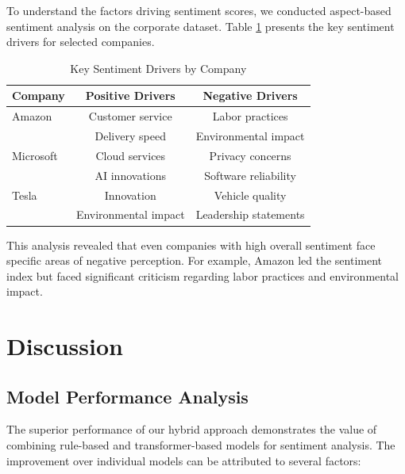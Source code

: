 \documentclass[conference]{IEEEtran}
\begin{document}
To understand the factors driving sentiment scores, we conducted aspect-based sentiment analysis on the corporate dataset. Table \ref{tab:sentiment_drivers} presents the key sentiment drivers for selected companies.

\begin{table}[!t]
\caption{Key Sentiment Drivers by Company}
\label{tab:sentiment_drivers}
\centering
\begin{tabular}{lcc}
\toprule
\textbf{Company} & \textbf{Positive Drivers} & \textbf{Negative Drivers} \\
\midrule
Amazon & Customer service & Labor practices \\
       & Delivery speed   & Environmental impact \\
\midrule
Microsoft & Cloud services & Privacy concerns \\
          & AI innovations  & Software reliability \\
\midrule
Tesla & Innovation & Vehicle quality \\
      & Environmental impact & Leadership statements \\
\bottomrule
\end{tabular}
\end{table}

This analysis revealed that even companies with high overall sentiment face specific areas of negative perception. For example, Amazon led the sentiment index but faced significant criticism regarding labor practices and environmental impact.


\section{Discussion}

\subsection{Model Performance Analysis}
The superior performance of our hybrid approach demonstrates the value of combining rule-based and transformer-based models for sentiment analysis. The improvement over individual models can be attributed to several factors:
\end{document}
